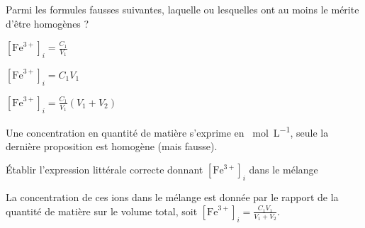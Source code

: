 \begin{enonce}
Parmi les formules fausses suivantes, laquelle ou lesquelles ont au moins le mérite d'être homogènes ?
\begin{listeQCM1Colonne}
	\item $[\textrm{Fe}^{3+}]_i=\frac{C_1}{V_1}$
	\item $[\textrm{Fe}^{3+}]_i=C_1V_1$
	\item $[\textrm{Fe}^{3+}]_i=\frac{C_1}{V_1}(V_1+V_2)$
	\end{listeQCM1Colonne}		
\end{enonce}

\reponse{\reponseC{}}

\begin{corrige}
Une concentration en quantité de matière s'exprime en \SI{}{\mole\per\liter}, seule la dernière proposition est homogène (mais fausse).
\end{corrige}





\begin{enonce}
Établir l'expression littérale correcte donnant $[\textrm{Fe}^{3+}]_i$ dans le mélange
\end{enonce}


\begin{corrige}
La concentration de ces ions dans le mélange est donnée par le rapport de la quantité de matière sur le volume total, soit $[\textrm{Fe}^{3+}]_i=\frac{C_1V_1}{V_1+V_2}$.
\end{corrige}


\finEntrainement





\hauteurLargeurCadreReponse		{7mm}{4cm}
\initialisationEntrainement

